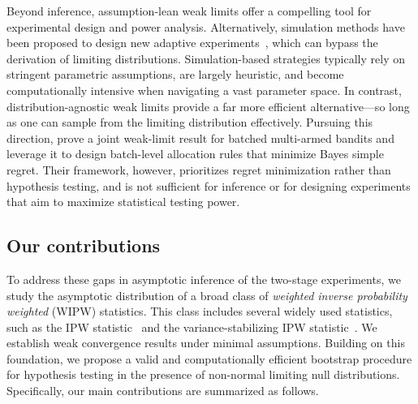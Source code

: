 \documentclass[12pt]{article}
\begin{document}
Beyond inference, assumption-lean weak limits offer a compelling tool for experimental design and power analysis. Alternatively, simulation methods have been proposed to design new adaptive experiments~\citep[Chapter VII;][]{us2019adaptive}, which can bypass the derivation of limiting distributions. Simulation-based strategies typically rely on stringent parametric assumptions, are largely heuristic, and become computationally intensive when navigating a vast parameter space. In contrast, distribution-agnostic weak limits provide a far more efficient alternative—so long as one can sample from the limiting distribution effectively. Pursuing this direction, \citet{che2023adaptive} prove a joint weak-limit result for batched multi-armed bandits and leverage it to design batch-level allocation rules that minimize Bayes simple regret. 
Their framework, however, prioritizes regret minimization rather than hypothesis testing, 
and is not sufficient for  inference or
for designing experiments that aim to maximize statistical testing power. 

\subsection{Our contributions}\label{sec:contribution}

To address these gaps in asymptotic inference of the two-stage experiments, 
we study the asymptotic distribution of a broad class of \textit{weighted inverse probability weighted} (WIPW) statistics. 
This class includes several widely used statistics, such as the IPW statistic~\citep{bowden2017unbiased} and the variance-stabilizing IPW statistic~\citep{luedtke2016statistical,bibaut2021post,Hadad2021}. We establish weak convergence results under minimal assumptions. Building on this foundation, we propose a valid and computationally efficient bootstrap procedure for hypothesis testing in the presence of non-normal limiting null distributions. Specifically, our main contributions are summarized as follows.
\end{document}

